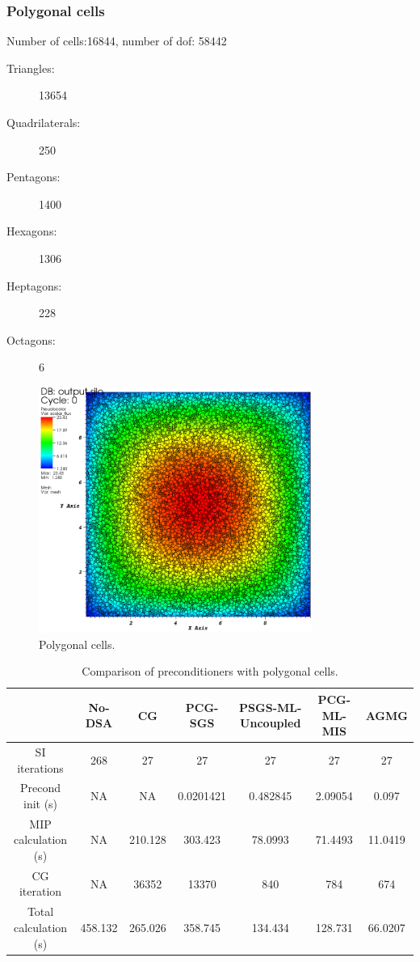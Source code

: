 \subsubsection{Polygonal cells}
Number of cells:16844, number of dof: 58442\\
\begin{description}
\item[Triangles:] 13654
\item[Quadrilaterals:] 250
\item[Pentagons:] 1400
\item[Hexagons:] 1306
\item[Heptagons:] 228
\item[Octagons:] 6
\end{description}
\begin{figure}[H]
\centering
\includegraphics[width=0.8\textwidth]{homog_poly_crop}
\caption{Polygonal cells.}
\end{figure}
\begin{table}[H]
\begin{center}
\begin{tabular}{|c|c|c|c|c|c|c|}
\hline
 & No-DSA & CG & PCG-SGS & PSGS-ML-Uncoupled & PCG-ML-MIS & AGMG\\
\hline
SI iterations & 268 & 27 & 27 & 27 & 27 & 27\\
Precond init (s) & NA & NA & 0.0201421 & 0.482845 & 2.09054 & 0.097\\
MIP calculation (s) & NA & 210.128 & 303.423 & 78.0993 & 71.4493 & 11.0419\\
CG iteration & NA & 36352 & 13370 & 840 & 784 & 674\\
Total calculation (s) & 458.132 & 265.026 & 358.745 & 134.434 & 128.731 &
66.0207\\
\hline
\end{tabular}
\caption{Comparison of preconditioners with polygonal cells.}
\end{center}
\end{table}

